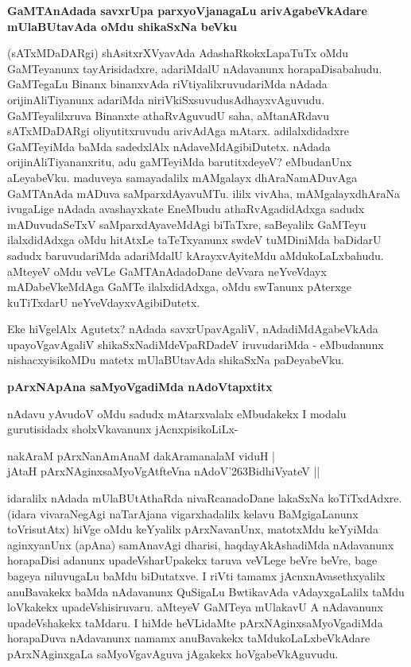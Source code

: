 {\bigskip
\noindent
{\large\bf GaMTAnAdada savxrUpa parxyoVjanagaLu arivAgabeVkAdare mUlaBUtavAda oMdu shikaSxNa beVku}}\label{page169}
\medskip

\noindent
(sATxMDaDARgi) shAsitxrXVyavAda AdashaRkokxLapaTuTx oMdu GaMTeyanunx tayArisi\-dadxre, adariM\-dalU nAdavanunx horapaDisabahudu. GaMTegaLu Binanx binanxvAda riVtiyalilxruvudariMda nAdada oriji\-nAliTi\-yanunx adariMda niriVkiSxsuvudu\-sAdhayxvAguvudu. GaMTeyalilxruva Binanxte athaRvAguvudU saha, aMtanARdavu sATxMDaDARgi oliyutitxruvudu arivAdAga mAtarx. adilalxdidadxre GaMTeyiMda baMda sadedxlAlx nAdaveMdAgibiDutetx. nAdada orijinAliTiyananxritu, adu gaMTeyiMda barutitxdeyeV? eMbu\-danUnx aLeyabeVku. maduveya samayadalilx mAMgalayx dhAraNamADuvAga GaMTAnAda mADuva saMparxdAyavuMTu. ililx vivAha, mAMgalayxdhAraNa ivugaLige nAdada avashayxkate EneMbudu athaR\-vAgadidAdxga sadudx mADuvudaSeTxV saMparxdAyaveMdAgi biTaTxre, saBeyalilx GaMTeyu ilalxdidAdxga oMdu hitAtxLe taTeTxyanunx swdeV tuMDiniMda baDidarU sadudx baruvudariMda adariMdalU kArayxvAyiteMdu aMdukoLaLxbahudu. aMteyeV oMdu veVLe GaMTAnAda\-doDane deVvara neYveVdayx mADabeVkeMdAga GaMTe ilalxdidAdxga, oMdu swTanunx pAterxge kuTiTxdarU neYveVdayxvAgi\-biDutetx. 

Eke hiVgelAlx Agutetx? nAdada savxrUpavAgaliV, nAdadiMdAgabeVkAda upayoVgavAgaliV shikaSxNa\-diMdeVpaRDadeV iruvudariMda - eMbudanunx nishacxyisikoMDu matetx mUlaBUtavAda shikaSxNa paDeyabeVku.

{\bigskip
\noindent
{\large\bf pArxNApAna saMyoVgadiMda nAdoVtapxtitx}}\label{page170}
\medskip

\noindent
nAdavu yAvudoV oMdu sadudx mAtarxvalalx eMbudakekx I modalu gurutisidadx sholxVkavanunx jAcnxpisikoLiLx-

\begin{shloka}
nakAraM pArxNanAmAnaM dakAramanalaM viduH |\\\label{170}
jAtaH pArxNAginxsaMyoVgAtfteVna nAdoV\char'263BidhiVyateV ||
\end{shloka}

idaralilx nAdada mUlaBUtAthaRda nivaRcanadoDane lakaSxNa koTiTxdAdxre. (idara vivaraNegAgi naTa\-rAjana vigarxhadalilx kelavu BaMgigaLanunx toVrisutAtx) hiVge oMdu keYyalilx pArxNavanUnx, matotxMdu keYyiMda aginxyanUnx (apAna) samAnavAgi dharisi, haqdayAkAshadiMda nAdavanunx horapaDisi adanunx\- upadeVsharUpakekx taruva veVLege beVre beVre, bage bageya niluvugaLu baMdu biDutatxve. I riVti tamamx jAcnxnAvasethxyalilx anuBavakekx baMda nAdavanunx QuSigaLu BwtikavAda vAdayxgaLalilx taMdu loVkakekx upadeVshi\-siruvaru. aMteyeV GaMTeya mUlakavU A nAdavanunx upadeVshakekx taMdaru. I hiMde heVLi\-daMte pArxNAginxsaMyoVgadiMda horapaDuva nAdavanunx namamx anuBavakekx taMdukoLaLxbeVkAdare pArxNAginxgaLa saMyoVgavAguva jAgakekx hoVgabeVkAguvudu.

